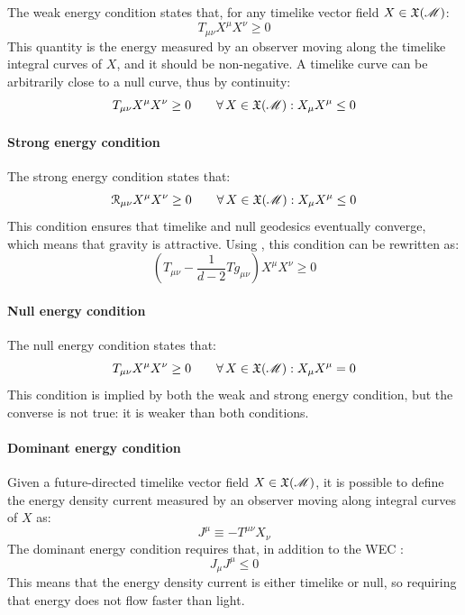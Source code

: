 The weak energy condition states that, for any timelike vector field $ X \in \mathfrak{X}(\mathscr{M}) $:
\begin{equation*}
  T_{\mu \nu} X^\mu X^\nu \ge 0
\end{equation*}
This quantity is the energy measured by an observer moving along the timelike integral curves of $ X $, and it should be non-negative. A timelike curve can be arbitrarily close to a null curve, thus by continuity:
\begin{equation}
  T_{\mu \nu} X^\mu X^\nu \ge 0 \qquad \forall\, X \in \mathfrak{X}(\mathscr{M}) : X_\mu X^\mu \le 0
  \label{eq:weak-en-cond}
\end{equation}

\paragraph{Strong energy condition}

The strong energy condition states that:
\begin{equation}
  \EuScript{R}_{\mu \nu} X^\mu X^\nu \ge 0
  \qquad
  \forall\, X \in \mathfrak{X}(\mathscr{M}) : X_\mu X^\mu \le 0
\end{equation}
This condition ensures that timelike and null geodesics eventually converge, which means that gravity is attractive. Using , this condition can be rewritten as:
\begin{equation*}
  \left( T_{\mu \nu} - \frac{1}{d-2} T g_{\mu \nu} \right) X^\mu X^\nu \ge 0
\end{equation*}

\paragraph{Null energy condition}

The null energy condition states that:
\begin{equation}
  T_{\mu \nu} X^\mu X^\nu \ge 0
  \qquad
  \forall\, X \in \mathfrak{X}(\mathscr{M}) : X_\mu X^\mu = 0
\end{equation}
This condition is implied by both the weak and strong energy condition, but the converse is not true: it is weaker than both conditions.

\paragraph{Dominant energy condition}

Given a future-directed timelike vector field $ X \in \mathfrak{X}(\mathscr{M}) $, it is possible to define the energy density current measured by an observer moving along integral curves of $ X $ as:
\begin{equation*}
  J^\mu \equiv - T^{\mu \nu} X_\nu
\end{equation*}
The dominant energy condition requires that, in addition to the WEC :
\begin{equation}
  J_\mu J^\mu \le 0
  \label{eq:dominant-en-cond}
\end{equation}
This means that the energy density current is either timelike or null, so requiring that energy does not flow faster than light.

